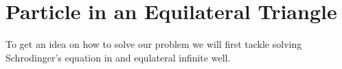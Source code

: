 \chapter{Particle in an Equilateral Triangle}

\quad To get an idea on how to solve our problem we will first tackle solving Schrodinger's equation in and equlateral infinite well.
